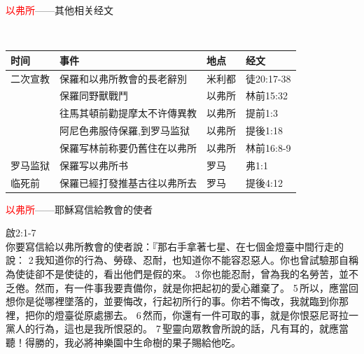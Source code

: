 \documentclass{beamer}
\begin{document}
\begin{frame}{\textcolor{red}{以弗所}——其他相关经文}
\begin{block}{}\\
\begin{table}
\hspace{-1.cm}
\begin{tabular}{l|l|l|l}
时间 & 事件 &地点&经文\\\hline\hline
二次宣教&保羅和以弗所教會的長老辭別&米利都&徒20:17-38\\
&保羅同野獸戰鬥&以弗所&林前15:32\\
&往馬其頓前勸提摩太不许傳異教&以弗所&提前1:3  \\
&阿尼色弗服侍保羅,到罗马监狱&以弗所&提後1:18 \\
&保羅写林前称要仍舊住在以弗所&以弗所&林前16:8-9\\\hline\hline
罗马监狱&保羅写以弗所书&罗马&弗1:1\\\hline\hline
临死前&保羅已經打發推基古往以弗所去&罗马&提後4:12\\\hline\hline
\end{tabular}
\end{table}
\end{block}
\end{frame}

\begin{frame}{\textcolor{red}{以弗所}——耶穌寫信給教會的使者}
\begin{block}{啟2:1-7}\\
你要寫信給以弗所教會的使者說：『那右手拿著七星、在七個金燈臺中間行走的說： 2 我知道你的行為、勞碌、忍耐，也知道你不能容忍惡人。你也曾試驗那自稱為使徒卻不是使徒的，看出他們是假的來。 3 你也能忍耐，曾為我的名勞苦，並不乏倦。然而，有一件事我要責備你，就是你把起初的愛心離棄了。 5 所以，應當回想你是從哪裡墜落的，並要悔改，行起初所行的事。你若不悔改，我就臨到你那裡，把你的燈臺從原處挪去。 6 然而，你還有一件可取的事，就是你恨惡尼哥拉一黨人的行為，這也是我所恨惡的。 7 聖靈向眾教會所說的話，凡有耳的，就應當聽！得勝的，我必將神樂園中生命樹的果子賜給他吃。
\end{block}
\end{frame}
\end{document}
